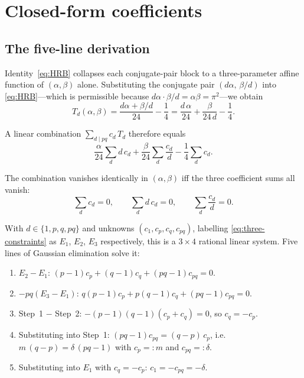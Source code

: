 \documentclass[11pt,reqno]{amsart}
\theoremstyle{definition}
\begin{document}
\section{Closed-form coefficients}\label{sec:derivation}

\subsection{The five-line derivation}\label{sec:fiveline}

Identity~\eqref{eq:HRB} collapses each conjugate-pair block to a
three-parameter affine function of $(\alpha,\beta)$ alone.
Substituting the conjugate pair $(d\alpha,\, \beta/d)$ into
\cref{eq:HRB}---which is permissible because
$d\alpha \cdot \beta/d = \alpha\beta = \pi^2$---we obtain
\begin{equation}\label{eq:Td-affine}
T_d(\alpha,\beta) = \frac{d\alpha + \beta/d}{24} - \frac{1}{4}
= \frac{d\,\alpha}{24} + \frac{\beta}{24\,d} - \frac{1}{4}.
\end{equation}

A linear combination $\sum_{d \mid pq} c_d\, T_d$ therefore equals
\begin{equation}\label{eq:combination}
\frac{\alpha}{24}\sum_{d} d\,c_d
+ \frac{\beta}{24}\sum_{d} \frac{c_d}{d}
- \frac{1}{4}\sum_d c_d.
\end{equation}

The combination vanishes identically in $(\alpha,\beta)$ iff the three
coefficient sums all vanish:
\begin{equation}\label{eq:three-constraints}
\sum_d c_d = 0,\qquad
\sum_d d\,c_d = 0,\qquad
\sum_d \frac{c_d}{d} = 0.
\end{equation}

With $d \in \{1, p, q, pq\}$ and unknowns $(c_1, c_p, c_q, c_{pq})$,
labelling \cref{eq:three-constraints} as $E_1$, $E_2$, $E_3$
respectively, this is a $3 \times 4$ rational linear system. Five
lines of Gaussian elimination solve it:
\begin{enumerate}
\item $E_2 - E_1$:\quad
$(p-1)c_p + (q-1)c_q + (pq-1)c_{pq} = 0$.
\item $-pq(E_3 - E_1)$:\quad
$q(p-1)c_p + p(q-1)c_q + (pq-1)c_{pq} = 0$.
\item Step~1 $-$ Step~2:\quad
$-(p-1)(q-1)(c_p + c_q) = 0$, so $c_q = -c_p$.
\item Substituting into Step~1:\quad
$(pq-1)c_{pq} = (q-p)\,c_p$, i.e.\
$m\,(q-p) = \delta\,(pq-1)$ with $c_p =: m$ and $c_{pq} =: \delta$.
\item Substituting into $E_1$ with $c_q = -c_p$:\quad
$c_1 = -c_{pq} = -\delta$.
\end{enumerate}
\end{document}
